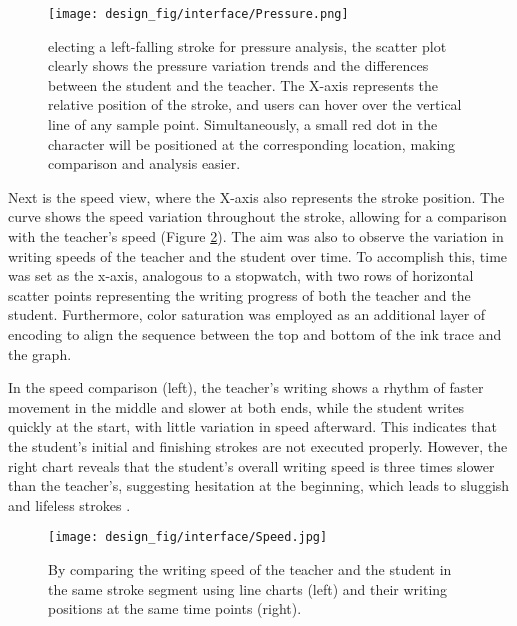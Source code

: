 \begin{figure}[t]
    \centering
    \texttt{[image: design\_fig/interface/Pressure.png]}
    \caption{electing a left-falling stroke for pressure analysis, the scatter plot clearly shows the pressure variation trends and the differences between the student and the teacher. The X-axis represents the relative position of the stroke, and users can hover over the vertical line of any sample point. Simultaneously, a small red dot in the character will be positioned at the corresponding location, making comparison and analysis easier.}
    \label{fig: Pressure}
\end{figure}

Next is the speed view, where the X-axis also represents the stroke position. The curve shows the speed variation throughout the stroke, allowing for a comparison with the teacher's speed (Figure \ref{ref: Speed}). The aim was also to observe the variation in writing speeds of the teacher and the student over time. To accomplish this, time was set as the x-axis, analogous to a stopwatch, with two rows of horizontal scatter points representing the writing progress of both the teacher and the student. Furthermore, color saturation was employed as an additional layer of encoding to align the sequence between the top and bottom of the ink trace and the graph.

In the speed comparison (left), the teacher's writing shows a rhythm of faster movement in the middle and slower at both ends, while the student writes quickly at the start, with little variation in speed afterward. This indicates that the student's initial and finishing strokes are not executed properly. However, the right chart reveals that the student's overall writing speed is three times slower than the teacher's, suggesting hesitation at the beginning, which leads to sluggish and lifeless strokes \cite{chiang1974chinese}.



\begin{figure}[H]
    \centering
    \texttt{[image: design\_fig/interface/Speed.jpg]}
    \caption{By comparing the writing speed of the teacher and the student in the same stroke segment using line charts (left) and their writing positions at the same time points (right). }
    \label{ref: Speed}
\end{figure}

